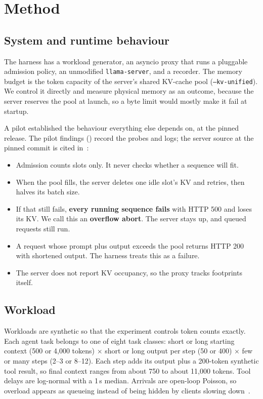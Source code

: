 
\section{Method}\label{sec:method}

\subsection{System and runtime behaviour}\label{sec:system}

The harness has a workload generator, an asyncio proxy that runs a pluggable admission policy, an unmodified \texttt{llama-server}, and a recorder. The memory budget is the token capacity of the server's shared KV-cache pool (\texttt{--kv-unified}). We control it directly and measure physical memory as an outcome, because the server reserves the pool at launch, so a byte limit would mostly make it fail at startup.

A pilot established the behaviour everything else depends on, at the pinned release. The pilot findings () record the probes and logs; the server source at the pinned commit is cited in~\cite{llamacpp}:
\begin{itemize}
  \item Admission counts slots only. It never checks whether a sequence will fit.
  \item When the pool fills, the server deletes one idle slot's KV and retries, then halves its batch size.
  \item If that still fails, \textbf{every running sequence fails} with HTTP 500 and loses its KV. We call this an \textbf{overflow abort}. The server stays up, and queued requests still run.
  \item A request whose prompt plus output exceeds the pool returns HTTP 200 with shortened output. The harness treats this as a failure.
  \item The server does not report KV occupancy, so the proxy tracks footprints itself.
\end{itemize}

\subsection{Workload}\label{sec:workload}

Workloads are synthetic so that the experiment controls token counts exactly. Each agent task belongs to one of eight task classes: short or long starting context (500 or 4,000 tokens) $\times$ short or long output per step (50 or 400) $\times$ few or many steps (2--3 or 8--12). Each step adds its output plus a 200-token synthetic tool result, so final context ranges from about 750 to about 11,000 tokens. Tool delays are log-normal with a 1\,s median. Arrivals are open-loop Poisson, so overload appears as queueing instead of being hidden by clients slowing down~\cite{schroeder2006open}.

